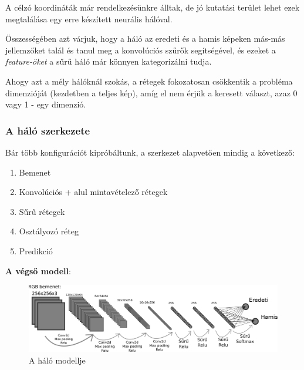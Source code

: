 A célzó koordináták már rendelkezésünkre álltak, de jó kutatási terület lehet ezek 
megtalálása egy erre készített neurális hálóval.


Összességében azt várjuk, hogy a háló az eredeti és a hamis képeken más-más 
jellemzőket talál és tanul meg a konvolúciós szűrők segítségével, és ezeket
a \textit{feature-öket} a sűrű háló már könnyen kategorizálni tudja.

Ahogy azt a mély hálóknál szokás, a rétegek fokozatosan csökkentik a probléma
dimenzióját (kezdetben a teljes kép), amíg el nem érjük a keresett választ, azaz 0 vagy 1 - 
egy dimenzió.

\subsubsection{A háló szerkezete}

Bár több konfigurációt kipróbáltunk, a szerkezet alapvetően mindig a következő:



\begin{enumerate} [itemsep=-1ex]
	\item Bemenet
	\item Konvolúciós + alul mintavételező rétegek
	\item Sűrű rétegek
	\item Osztályozó réteg
	\item Predikció
\end{enumerate}

\textbf{A végső modell}:
\begin{figure} [h!]
	\label{fig:predictor-halo-modell}
	\centering
	\includegraphics[scale=0.3]{img/predictor-network-modell.pdf}
	\caption{A háló modellje}
\end{figure}

